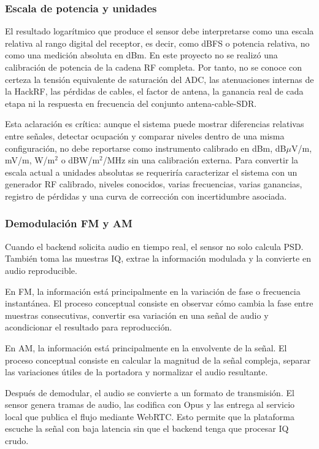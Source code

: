 \subsubsection{Escala de potencia y unidades}

El resultado logarítmico que produce el sensor debe interpretarse como una escala
relativa al rango digital del receptor, es decir, como dBFS o potencia relativa,
no como una medición absoluta en dBm. En este proyecto no se realizó una
calibración de potencia de la cadena RF completa. Por tanto, no se conoce con
certeza la tensión equivalente de saturación del ADC, las atenuaciones internas de
la HackRF, las pérdidas de cables, el factor de antena, la ganancia real de cada
etapa ni la respuesta en frecuencia del conjunto antena-cable-SDR.

Esta aclaración es crítica: aunque el sistema puede mostrar diferencias relativas
entre señales, detectar ocupación y comparar niveles dentro de una misma
configuración, no debe reportarse como instrumento calibrado en dBm, dB$\mu$V/m,
mV/m, W/m$^2$ o dBW/m$^2$/MHz sin una calibración externa. Para convertir la
escala actual a unidades absolutas se requeriría caracterizar el sistema con un
generador RF calibrado, niveles conocidos, varias frecuencias, varias ganancias,
registro de pérdidas y una curva de corrección con incertidumbre asociada.

\subsubsection{Demodulación FM y AM}

Cuando el backend solicita audio en tiempo real, el sensor no solo calcula PSD.
También toma las muestras IQ, extrae la información modulada y la convierte en
audio reproducible.

En FM, la información está principalmente en la variación de fase o frecuencia
instantánea. El proceso conceptual consiste en observar cómo cambia la fase entre
muestras consecutivas, convertir esa variación en una señal de audio y acondicionar
el resultado para reproducción.

En AM, la información está principalmente en la envolvente de la señal. El proceso
conceptual consiste en calcular la magnitud de la señal compleja, separar las
variaciones útiles de la portadora y normalizar el audio resultante.

Después de demodular, el audio se convierte a un formato de transmisión. El sensor
genera tramas de audio, las codifica con Opus y las entrega al servicio local que
publica el flujo mediante WebRTC. Esto permite que la plataforma escuche la señal
con baja latencia sin que el backend tenga que procesar IQ crudo.

